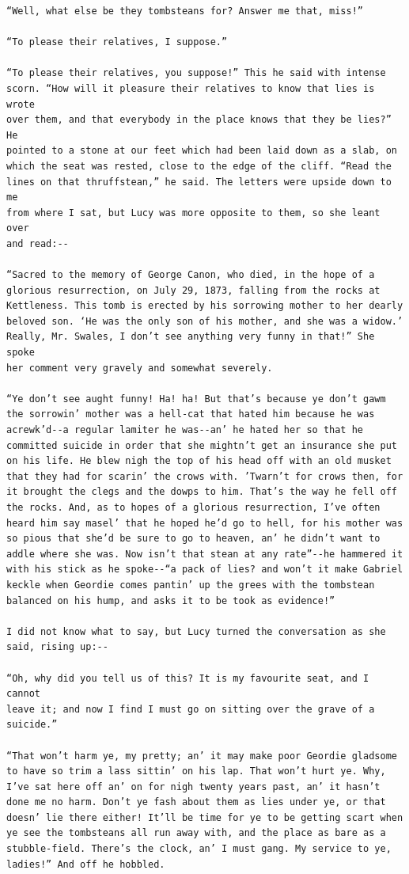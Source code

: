 \documentclass{article}
\begin{document}
\begin{verbatim}
“Well, what else be they tombsteans for? Answer me that, miss!”

“To please their relatives, I suppose.”

“To please their relatives, you suppose!” This he said with intense
scorn. “How will it pleasure their relatives to know that lies is wrote
over them, and that everybody in the place knows that they be lies?” He
pointed to a stone at our feet which had been laid down as a slab, on
which the seat was rested, close to the edge of the cliff. “Read the
lines on that thruffstean,” he said. The letters were upside down to me
from where I sat, but Lucy was more opposite to them, so she leant over
and read:--

“Sacred to the memory of George Canon, who died, in the hope of a
glorious resurrection, on July 29, 1873, falling from the rocks at
Kettleness. This tomb is erected by his sorrowing mother to her dearly
beloved son. ‘He was the only son of his mother, and she was a widow.’
Really, Mr. Swales, I don’t see anything very funny in that!” She spoke
her comment very gravely and somewhat severely.

“Ye don’t see aught funny! Ha! ha! But that’s because ye don’t gawm
the sorrowin’ mother was a hell-cat that hated him because he was
acrewk’d--a regular lamiter he was--an’ he hated her so that he
committed suicide in order that she mightn’t get an insurance she put
on his life. He blew nigh the top of his head off with an old musket
that they had for scarin’ the crows with. ’Twarn’t for crows then, for
it brought the clegs and the dowps to him. That’s the way he fell off
the rocks. And, as to hopes of a glorious resurrection, I’ve often
heard him say masel’ that he hoped he’d go to hell, for his mother was
so pious that she’d be sure to go to heaven, an’ he didn’t want to
addle where she was. Now isn’t that stean at any rate”--he hammered it
with his stick as he spoke--“a pack of lies? and won’t it make Gabriel
keckle when Geordie comes pantin’ up the grees with the tombstean
balanced on his hump, and asks it to be took as evidence!”

I did not know what to say, but Lucy turned the conversation as she
said, rising up:--

“Oh, why did you tell us of this? It is my favourite seat, and I cannot
leave it; and now I find I must go on sitting over the grave of a
suicide.”

“That won’t harm ye, my pretty; an’ it may make poor Geordie gladsome
to have so trim a lass sittin’ on his lap. That won’t hurt ye. Why,
I’ve sat here off an’ on for nigh twenty years past, an’ it hasn’t
done me no harm. Don’t ye fash about them as lies under ye, or that
doesn’ lie there either! It’ll be time for ye to be getting scart when
ye see the tombsteans all run away with, and the place as bare as a
stubble-field. There’s the clock, an’ I must gang. My service to ye,
ladies!” And off he hobbled.


\end{verbatim}
\end{document}
